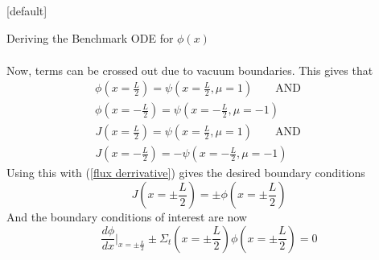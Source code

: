 \documentclass[9pt,t]{beamer}
\makeatletter
\newcommand{\QAND}{\qquad \text{AND} \qquad}
\newenvironment{withoutheadline}{
       \setbeamertemplate{headline}[default]
       \def\beamer@entrycode{\vspace*{-\headheight}}
    }{}
\makeatother
\begin{document}
\begin{withoutheadline}
\begin{frame}[allowframebreaks]{Deriving the Benchmark ODE for $\phi(x)$}
\begin{itemize}
\begin{multline}
        \end{multline}
        Now, terms can be crossed out due to vacuum boundaries. This gives that
        \begin{multline}
            \phi(x=\frac{L}{2}) =  \psi(x=\frac{L}{2},\mu =1) \QAND \\ \phi(x=-\frac{L}{2}) =  \psi(x=-\frac{L}{2},\mu =-1)
        \end{multline}
        \begin{multline}
            J(x=\frac{L}{2}) = \psi(x=\frac{L}{2},\mu =1) \QAND \\ J(x=-\frac{L}{2}) = - \psi(x=-\frac{L}{2},\mu =-1)
        \end{multline}
        Using this with (\ref{flux derrivative}) gives the desired boundary conditions
        \begin{equation}
            J(x=\pm \frac{L}{2}) = \pm \phi(x=\pm \frac{L}{2})
        \end{equation}
        And the boundary conditions of interest are now
        \begin{equation}
            \frac{d\phi}{dx}\bigg|_{x=\pm \frac{L}{2}} \pm  \Sigma_{t}(x=\pm \frac{L}{2})  \phi(x=\pm \frac{L}{2})  = 0
        \end{equation}
    \end{itemize}
\end{frame}
\end{withoutheadline}
\end{document}
